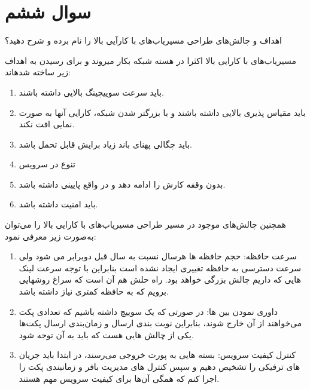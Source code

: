 \section{سوال ششم}
اهداف و چالش‌های طراحی مسیریاب‌های با کارآیی بالا را نام برده و شرح دهید؟




\begin{qsolve}
	مسیریاب‌­های با کارایی بالا اکثرا در هسته شبکه بکار می­روند و برای رسیدن به اهداف زیر ساخته شده­اند:
	\begin{enumerate}
		\item 
		 باید سرعت سوییچینگ بالایی داشته باشند.
		
		\item 
		 باید مقیاس پذیری بالایی داشته باشند و با بزرگتر شدن شبکه، کارایی آن­ها به صورت نمایی افت نکند.
		
		\item 
		 باید چگالی پهنای باند زیاد برایش قابل تحمل باشد.
		
		\item 
		 تنوع در سرویس 
		
		\item 
		 بدون وقفه کارش را ادامه دهد و در واقع  پایینی داشته باشد.
		
		\item 
		باید امنیت داشته باشد.
	\end{enumerate}
	
	همچنین چالش‌های موجود در مسیر طراحی مسیریاب‌های با کارایی بالا را می‌توان به‌صورت زیر معرفی نمود:
	
	\begin{enumerate}
		\item 
		سرعت حافظه: حجم حافظه ها هرسال نسبت به سال قبل دوبرابر می شود ولی سرعت دسترسی به حافظه تغییری ایجاد نشده است بنابراین با توجه سرعت لینک هایی که داریم چالش بزرگی خواهد بود. راه حلش هم آن است که سراغ روشهایی برویم که به حافظه کمتری نیاز داشته باشد.
		
		\item 
		داوری نمودن بین ها: در صورتی که یک سوییچ داشته باشیم که تعدادی پکت می‌خواهند از آن خارج شوند، بنابراین نوبت بندی ارسال و زمان‌بندی ارسال پکت‌ها یکی از چالش هایی هست که باید به آن توجه شود.
		
		\item 
		کنترل کیفیت سرویس: بسته هایی به پورت خروجی می‌رسند، در ابتدا باید جریان های ترفیکی را تشخیص دهیم و سپس کنترل های مدیریت بافر و زمانبندی پکت را اجرا کنم که همگی آن‌ها برای کیفیت سرویس مهم هستند.
		

\end{enumerate}
\end{qsolve}
